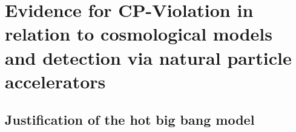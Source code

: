 



\section{Evidence for CP-Violation in relation to cosmological models and detection via natural particle accelerators}
%

\subsection{Justification of the hot big bang model}

